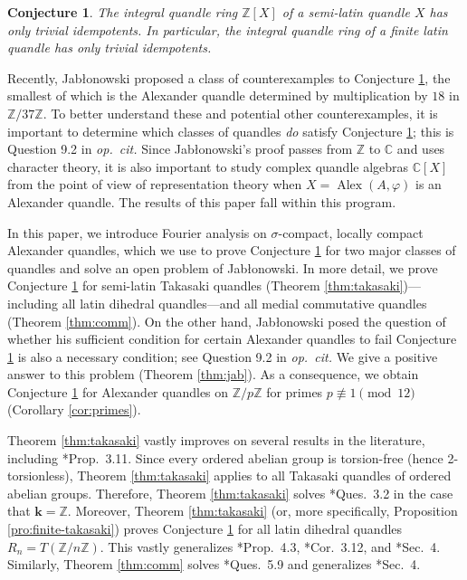 \documentclass[12pt]{amsart}
\newtheorem{conj}[thm]{Conjecture}
\theoremstyle{definition}
\theoremstyle{remark}
\newcommand{\C}{\mathbb{C}}
\newcommand{\Z}{\mathbb{Z}}
\renewcommand{\phi}{\varphi}
\def\Alex{\operatorname{Alex}}
\begin{document}
\begin{conj}\label{Main conjecture}
The integral quandle ring $\Z[X]$ of a semi-latin quandle $X$ has only trivial idempotents. In particular, the integral quandle ring of a finite latin quandle has only trivial idempotents.
\end{conj}

Recently, Jab\l onowski \cite{counterexample} proposed a class of counterexamples to Conjecture \ref{Main conjecture}, the smallest of which is the Alexander quandle determined by multiplication by $18$ in $\Z/37\Z$. To better understand these and potential other counterexamples, it is important to determine which classes of quandles \emph{do} satisfy Conjecture \ref{Main conjecture}; this is Question 9.2 in \emph{op.\ cit.} Since Jab\l onowski's proof passes from $\Z$ to $\C$ and uses character theory, it is also important to study complex quandle algebras $\C[X]$ from the point of view of representation theory when $X=\Alex(A,\phi)$ is an Alexander quandle. The results of this paper fall within this program.

In this paper, we introduce Fourier analysis on $\sigma$-compact, locally compact Alexander quandles, which we use to prove Conjecture \ref{Main conjecture} for two major classes of quandles and solve an open problem of Jab\l onowski. In more detail, we prove Conjecture \ref{Main conjecture} for semi-latin Takasaki quandles (Theorem \ref{thm:takasaki})---including all latin dihedral quandles---and all medial commutative quandles (Theorem \ref{thm:comm}). On the other hand, Jab\l onowski posed the question of whether his sufficient condition for certain Alexander quandles to fail Conjecture \ref{Main conjecture} is also a necessary condition; see Question 9.2 in \emph{op.\ cit.} We give a positive answer to this problem (Theorem \ref{thm:jab}). As a consequence, we obtain Conjecture \ref{Main conjecture} for Alexander quandles on $\Z/p\Z$ for primes $p\not\equiv 1\pmod{12}$ (Corollary \ref{cor:primes}).

Theorem \ref{thm:takasaki} vastly improves on several results in the literature, including \cite{MR4565221}*{Prop.\ 3.11}. 
Since every ordered abelian group is torsion-free (hence 2-torsionless), Theorem \ref{thm:takasaki} applies to all Takasaki quandles of ordered abelian groups. Therefore, Theorem \ref{thm:takasaki} solves \cite{bardakov-elhamdadi-2026}*{Ques.\ 3.2} in the case that $\mathbf{k}=\Z$. Moreover, Theorem \ref{thm:takasaki} (or, more specifically, Proposition \ref{pro:finite-takasaki}) proves Conjecture \ref{Main conjecture} for all latin dihedral quandles $R_n=T(\Z/n\Z)$. This vastly generalizes \cite{BPS-2}*{Prop.\ 4.3}, \cite{MR4565221}*{Cor.\ 3.12}, and \cite{churchill}*{Sec.\ 4}. Similarly, Theorem \ref{thm:comm} solves \cite{bardakov-elhamdadi-2026}*{Ques.\ 5.9} and generalizes \cite{churchill}*{Sec.\ 4}.
\end{document}

